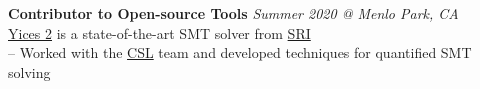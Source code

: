 \documentclass[margin,line,letter]{resume}
\begin{document}
\begin{resume}

    \textbf{Contributor to Open-source Tools} \hfill \emph{Summer 2020 @ Menlo Park, CA}\\ 
    \phantom{xx}\hspace{1ex} \href{https://github.com/SRI-CSL/yices2}{Yices 2} is a state-of-the-art SMT solver from \href{https://www.sri.com/}{SRI} \\
    \phantom{xx}\hspace{1ex} -- Worked with the \href{https://sri-csl.github.io/}{CSL} team and developed techniques for quantified SMT solving



\end{resume}
\end{document}
